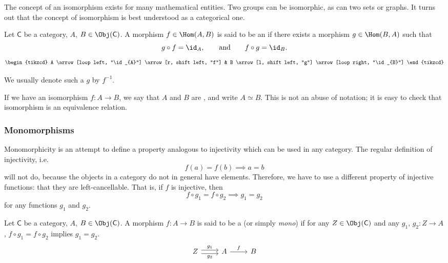 \documentclass[main.tex]{subfiles}
\begin{document}
The concept of an isomorphism exists for many mathematical entities. Two groups can be isomorphic, as can two sets or graphs. It turns out that the concept of isomorphism is best understood as a categorical one.
\begin{definition}[isomorphism]
  \label{def:isomorphism}
  Let $\mathsf{C}$ be a category, $A$, $B \in \Obj(\mathsf{C})$. A morphism $f \in \Hom(A,B)$ is said to be an  if there exists a morphism $g \in \Hom(B,A)$ such that
  \begin{equation*}
    g \circ f = \id_{A},\qquad\text{and}\qquad f \circ g = \id_{B}.
  \end{equation*}
  \begin{equation*}
    \begin{tikzcd}
      A
      \arrow[loop left, "\id_{A}"]
      \arrow[r, shift left, "f"]
      & B
      \arrow[l, shift left, "g"]
      \arrow[loop right, "\id_{B}"]
    \end{tikzcd}
  \end{equation*}

  We usually denote such a $g$ by $f^{-1}$.

  If we have an isomorphism $f\colon A \to B$, we say that $A$ and $B$ are , and write $A \simeq B$. This is not an abuse of notation; it is easy to check that isomorphism is an equivalence relation.
\end{definition}


\subsubsection{Monomorphisms}

Monomorphicity is an attempt to define a property analogous to injectivity which can be used in any category. The regular definition of injectivity, i.e.\
\begin{equation*}
  f(a) = f(b) \implies a = b
\end{equation*}
will not do, because the objects in a category do not in general have elements. Therefore, we have to use a different property of injective functions: that they are left-cancellable. That is, if $f$ is injective, then
\begin{equation*}
  f \circ g_{1} = f \circ g_{2} \implies g_{1} = g_{2}
\end{equation*}
for any functions $g_{1}$ and $g_{2}$.

\begin{definition}[monomorphism]
  \label{def:monomorphism}
  Let $\mathsf{C}$ be a category, $A$, $B\in \Obj(\mathsf{C})$. A morphism $f\colon A \to B$ is said to be a  (or simply \emph{mono}) if for any $Z \in \Obj(\mathsf{C})$ and any $g_{1}$, $g_{2}\colon Z \to A$, $f \circ g_{1} = f\circ g_{2}$ implies $g_{1} = g_{2}$.
  \begin{equation*}
    \begin{tikzcd}
      Z \arrow[r, shift left, "g_{1}"] \arrow[r, shift right, swap, "g_{2}"] & A \arrow[r, "f"] & B
    \end{tikzcd}
  \end{equation*}
\end{definition}
\end{document}
